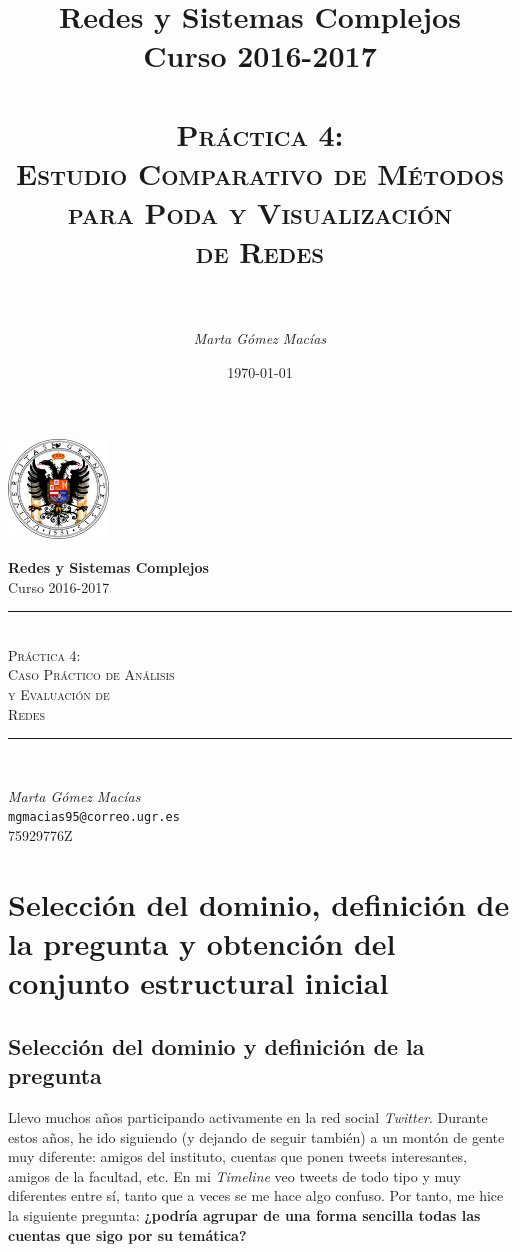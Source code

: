 \documentclass[10pt,a4paper,spanish]{article}
\title{
\normalfont \normalsize 
{\bf Redes y Sistemas Complejos} \\ Curso 2016-2017 \\ [25pt] %
\horrule{0.5pt} \\[0.4cm] %
\huge \textsc{Práctica 4: \\ Estudio Comparativo de Métodos \\ para Poda y Visualización \\ de Redes } \\ %
\horrule{2pt} \\[0.5cm] %
}
\author{\textit{Marta Gómez Macías}} %
\numberwithin{equation}{section} %
\numberwithin{figure}{section} %
\numberwithin{table}{section} %
\newcommand{\horrule}[1]{\rule{\linewidth}{#1}} %
\begin{document}
\renewcommand{\listtablename}{Índice de tablas}
\renewcommand{\tablename}{Tabla} 

\begin{titlepage}
\begin{center}
\includegraphics[width=0.2\textwidth]{../../ugr}

\normalfont \normalsize 
{\bf Redes y Sistemas Complejos} \\ Curso 2016-2017 \\ [25pt] %
\horrule{0.5pt} \\[0.4cm] %
{\huge \textsc{Práctica 4: \\ Caso Práctico de Análisis \\ y Evaluación de \\ Redes}} %
\horrule{2pt} \\[0.5cm] %

{\Large \textit{Marta Gómez Macías} \\ \texttt{mgmacias95@correo.ugr.es} \\ 75929776Z \\[0.5cm]

\date{\today}} %
\end{center}
\end{titlepage}

\tableofcontents %



\section{Selección del dominio, definición de la pregunta y obtención del conjunto estructural inicial}

\subsection{Selección del dominio y definición de la pregunta}
Llevo muchos años participando activamente en la red social \textit{Twitter}. Durante estos años, he ido siguiendo (y dejando de seguir también) a un montón de gente muy diferente: amigos del instituto, cuentas que ponen tweets interesantes, amigos de la facultad, etc. En mi \textit{Timeline} veo tweets de todo tipo y muy diferentes entre sí, tanto que a veces se me hace algo confuso. Por tanto, me hice la siguiente pregunta: \textbf{¿podría agrupar de una forma sencilla todas las cuentas que sigo por su temática?}
\end{document}

